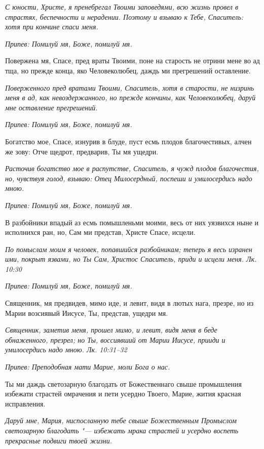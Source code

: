 \itshape С юности, Христе, я пренебрегал Твоими заповедями, всю жизнь провел в страстях, беспечности и нерадении. Поэтому и взываю к Тебе, Спаситель: хотя при кончине спаси меня.\normalfont{}


\itshape Припев:\normalfont{} Помилуй мя, Боже, помилуй мя.


Повержена мя, Спасе, пред враты Твоими, поне на старость не отрини мене во ад тща, но прежде конца, яко Человеколюбец, даждь ми прегрешений оставление.


\itshape Поверженного пред вратами Твоими, Спаситель, хотя в старости, не низринь меня в ад, как невоздержанного, но прежде кончины, как Человеколюбец, даруй мне оставление прегрешений.\normalfont{}


\itshape Припев:\normalfont{} Помилуй мя, Боже, помилуй мя.


Богатство мое, Спасе, изнурив в блуде, пуст есмь плодов благочестивых, алчен же зову: Отче щедрот, предварив, Ты мя ущедри.


\itshape Расточив богатство мое в распутстве, Спаситель, я чужд плодов благочестия, но, чувствуя голод, взываю: Отец Милосердный, поспеши и умилосердись надо мною.\normalfont{}


\itshape Припев:\normalfont{} Помилуй мя, Боже, помилуй мя.


В разбойники впадый аз есмь помышленьми моими, весь от них уязвихся ныне и исполнихся ран, но, Сам ми представ, Христе Спасе, исцели.


\itshape По помыслам моим я человек, попавшийся разбойникам; теперь я весь изранен ими, покрыт язвами, но Ты Сам, Христос Спаситель, приди и исцели меня. Лк. 10:30\normalfont{}


\itshape Припев:\normalfont{} Помилуй мя, Боже, помилуй мя.


Священник, мя предвидев, мимо иде, и левит, видя в лютых нага, презре, но из Марии возсиявый Иисусе, Ты, представ, ущедри мя.


\itshape Священник, заметив меня, прошел мимо, и левит, видя меня в беде обнаженного, презрел; но Ты, воссиявший от Марии Иисусе, прииди и умилосердись надо мною. Лк. 10:31–32\normalfont{}


\itshape Припев:\normalfont{} Преподобная мати Марие, моли Бога о нас.


Ты ми даждь светозарную благодать от Божественнаго свыше промышления избежати страстей омрачения и пети усердно Твоего, Марие, жития красная исправления.


\itshape Даруй мне, Мария, ниспосланную тебе свыше Божественным Промыслом светозарную благодать "--- избежать мрака страстей и усердно воспеть прекрасные подвиги твоей жизни.\normalfont{}


